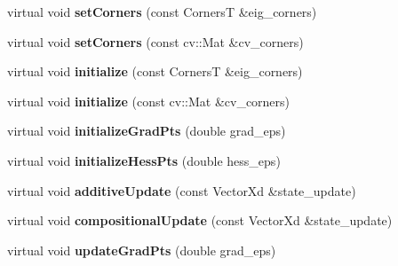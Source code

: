 \begin{DoxyCompactItemize}
\item 
\hypertarget{classStateSpaceModel_aeb5db576866d3baf2383393622cccab4}{virtual void {\bfseries set\-Corners} (const Corners\-T \&eig\-\_\-corners)}\label{classStateSpaceModel_aeb5db576866d3baf2383393622cccab4}

\item 
\hypertarget{classStateSpaceModel_a31783c4608560245a8438a05b8047d91}{virtual void {\bfseries set\-Corners} (const cv\-::\-Mat \&cv\-\_\-corners)}\label{classStateSpaceModel_a31783c4608560245a8438a05b8047d91}

\item 
\hypertarget{classStateSpaceModel_a6890ab582205f7fc0b69268631dd1b6b}{virtual void {\bfseries initialize} (const Corners\-T \&eig\-\_\-corners)}\label{classStateSpaceModel_a6890ab582205f7fc0b69268631dd1b6b}

\item 
\hypertarget{classStateSpaceModel_a5a27d741a12210245056f2b4afde24cd}{virtual void {\bfseries initialize} (const cv\-::\-Mat \&cv\-\_\-corners)}\label{classStateSpaceModel_a5a27d741a12210245056f2b4afde24cd}

\item 
\hypertarget{classStateSpaceModel_a9c16a921e2f1a9a909e776fd54212251}{virtual void {\bfseries initialize\-Grad\-Pts} (double grad\-\_\-eps)}\label{classStateSpaceModel_a9c16a921e2f1a9a909e776fd54212251}

\item 
\hypertarget{classStateSpaceModel_ad6598c85748f7b2906b9134a32b44383}{virtual void {\bfseries initialize\-Hess\-Pts} (double hess\-\_\-eps)}\label{classStateSpaceModel_ad6598c85748f7b2906b9134a32b44383}

\item 
\hypertarget{classStateSpaceModel_aa1e1e988c331faa9869965f0b3a2190c}{virtual void {\bfseries additive\-Update} (const Vector\-Xd \&state\-\_\-update)}\label{classStateSpaceModel_aa1e1e988c331faa9869965f0b3a2190c}

\item 
\hypertarget{classStateSpaceModel_afc3fbcc3f2dcc6e555289e1d0f3e156c}{virtual void {\bfseries compositional\-Update} (const Vector\-Xd \&state\-\_\-update)}\label{classStateSpaceModel_afc3fbcc3f2dcc6e555289e1d0f3e156c}

\item 
\hypertarget{classStateSpaceModel_a43ddc8f9b4c2551c9ec6b200ca0db5ca}{virtual void {\bfseries update\-Grad\-Pts} (double grad\-\_\-eps)}\label{classStateSpaceModel_a43ddc8f9b4c2551c9ec6b200ca0db5ca}


\end{DoxyCompactItemize}
